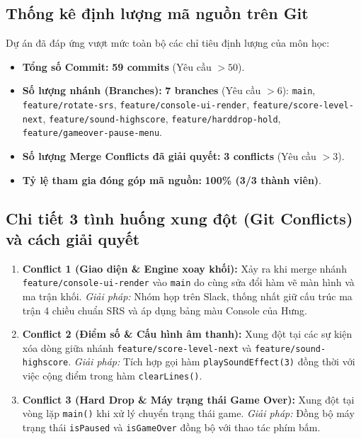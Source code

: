 \documentclass[12pt,a4paper]{article}
\begin{document}
\subsection{Thống kê định lượng mã nguồn trên Git}
Dự án đã đáp ứng vượt mức toàn bộ các chỉ tiêu định lượng của môn học:
\begin{itemize}
    \item \textbf{Tổng số Commit:} \textbf{59 commits} (Yêu cầu $> 50$).
    \item \textbf{Số lượng nhánh (Branches):} \textbf{7 branches} (Yêu cầu $> 6$):
    \texttt{main}, \texttt{feature/rotate-srs}, \texttt{feature/console-ui-render}, \texttt{feature/score-level-next}, \texttt{feature/sound-highscore}, \texttt{feature/harddrop-hold}, \texttt{feature/gameover-pause-menu}.
    \item \textbf{Số lượng Merge Conflicts đã giải quyết:} \textbf{3 conflicts} (Yêu cầu $> 3$).
    \item \textbf{Tỷ lệ tham gia đóng góp mã nguồn:} \textbf{100\% (3/3 thành viên)}.
\end{itemize}

\subsection{Chi tiết 3 tình huống xung đột (Git Conflicts) và cách giải quyết}
\begin{enumerate}
    \item \textbf{Conflict 1 (Giao diện \& Engine xoay khối):} Xảy ra khi merge nhánh \texttt{feature/console-ui-render} vào \texttt{main} do cùng sửa đổi hàm vẽ màn hình và ma trận khối. \textit{Giải pháp:} Nhóm họp trên Slack, thống nhất giữ cấu trúc ma trận 4 chiều chuẩn SRS và áp dụng bảng màu Console của Hưng.
    \item \textbf{Conflict 2 (Điểm số \& Cấu hình âm thanh):} Xung đột tại các sự kiện xóa dòng giữa nhánh \texttt{feature/score-level-next} và \texttt{feature/sound-highscore}. \textit{Giải pháp:} Tích hợp gọi hàm \texttt{playSoundEffect(3)} đồng thời với việc cộng điểm trong hàm \texttt{clearLines()}.
    \item \textbf{Conflict 3 (Hard Drop \& Máy trạng thái Game Over):} Xung đột tại vòng lặp \texttt{main()} khi xử lý chuyển trạng thái game. \textit{Giải pháp:} Đồng bộ máy trạng thái \texttt{isPaused} và \texttt{isGameOver} đồng bộ với thao tác phím bấm.
\end{enumerate}

\newpage

\end{document}
